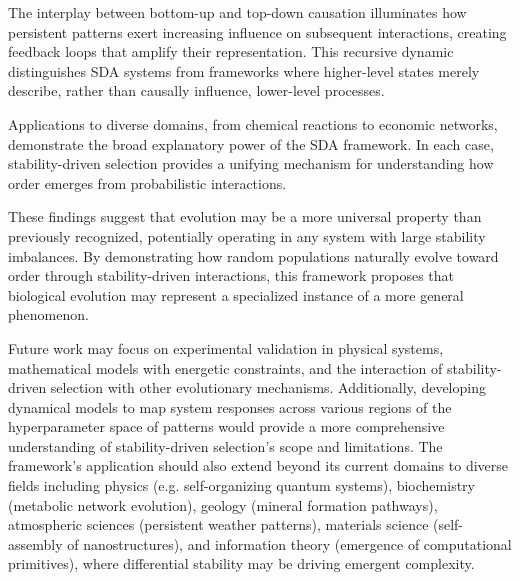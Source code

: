 \documentclass[preprint,12pt]{elsarticle}
\begin{document}
The interplay between bottom-up and top-down causation illuminates how persistent patterns exert increasing influence on subsequent interactions, creating feedback loops that amplify their representation. This recursive dynamic distinguishes SDA systems from frameworks where higher-level states merely describe, rather than causally influence, lower-level processes.

Applications to diverse domains, from chemical reactions to economic networks, demonstrate the broad explanatory power of the SDA framework. In each case, stability-driven selection provides a unifying mechanism for understanding how order emerges from probabilistic interactions.

These findings suggest that evolution may be a more universal property than previously recognized, potentially operating in any system with large stability imbalances. By demonstrating how random populations naturally evolve toward order through stability-driven interactions, this framework proposes that biological evolution may represent a specialized instance of a more general phenomenon.

Future work may focus on experimental validation in physical systems, mathematical models with energetic constraints, and the interaction of stability-driven selection with other evolutionary mechanisms. Additionally, developing dynamical models to map system responses across various regions of the hyperparameter space of patterns would provide a more comprehensive understanding of stability-driven selection's scope and limitations. The framework's application should also extend beyond its current domains to diverse fields including physics (e.g. self-organizing quantum systems), biochemistry (metabolic network evolution), geology (mineral formation pathways), atmospheric sciences (persistent weather patterns), materials science (self-assembly of nanostructures), and information theory (emergence of computational primitives), where differential stability may be driving emergent complexity.


\vspace{6pt} 
\end{document}
